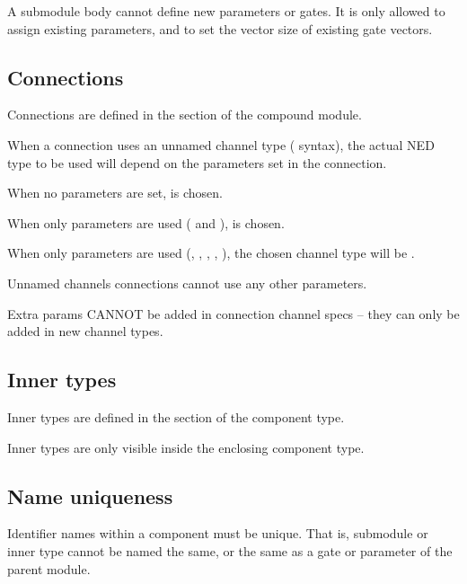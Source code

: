 A submodule body cannot define new parameters or gates. It is only
allowed to assign existing parameters, and to set the vector
size of existing gate vectors.



\subsection{Connections}
\label{ch-ned-ref:sec:connections}

Connections are defined in the  section of the compound module.

When a connection uses an unnamed channel type (\ttt{-{}->
\{\ldots\} -{}->} syntax), the actual NED type to be used will depend on the
parameters set in the connection.

When no parameters are set,  is chosen.

When only  parameters are used (
and ),  is chosen.

When only  parameters are used
(, , , , ),
the chosen channel type will be .

Unnamed channels connections cannot use any other parameters.

Extra params CANNOT be added in connection channel specs --
they can only be added in new channel types.



\subsection{Inner types}
\label{ch-ned-ref:sec:inner-types}

Inner types are defined in the  section of the component type.

Inner types are only visible inside the enclosing component type.



\subsection{Name uniqueness}

Identifier names within a component must be unique. That is, submodule
or inner type cannot be named the same, or the same as a gate or
parameter of the parent module.



